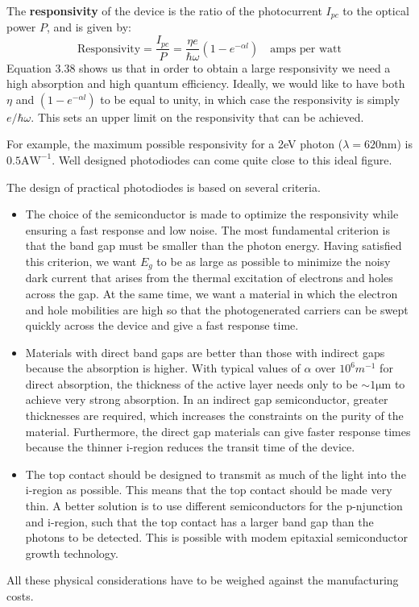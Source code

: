 \documentclass[12pt]{book}
\begin{document}
The \textbf{responsivity} of the device is the ratio of the photocurrent $I_{pc}$ to the optical power $P$, and is given by:
\begin{equation}\label{equa:3.38}
  \text{Responsivity}=\frac{I_{pc}}{P}=\frac{\eta e}{\hbar\omega}(1-e^{-\alpha l})\quad \text{amps per watt}
\end{equation}
Equation 3.38 shows us that in order to obtain a large responsivity we need a high absorption and high quantum efficiency. Ideally, we would like to have both $\eta$ and $(1 - e^{-\alpha l})$ to be equal to unity, in which case the responsivity is simply $e/\hbar\omega$. This sets an upper limit on the responsivity that can be achieved.

For example, the maximum possible responsivity for a 2eV photon ($\lambda = 620 \mathrm{nm}$) is $0.5\mathrm{AW^{-1}}$. Well designed photodiodes can come quite close to this ideal figure.

The design of practical photodiodes is based on several criteria.

\begin{itemize}
  \item The choice of the semiconductor is made to optimize the responsivity while ensuring a fast response and low noise. The most fundamental criterion is that the band gap must be smaller than the photon energy. Having satisfied this criterion, we want $E_g$ to be as large as possible to minimize the noisy dark current that arises from the thermal excitation of electrons and holes across the gap. At the same time, we want a material in which the electron and hole mobilities are high so that the photogenerated carriers can be swept quickly across the device and give a fast response time.
  \item Materials with direct band gaps are better than those with indirect gaps because the absorption is higher. With typical values of $\alpha$ over $10^6 m^{-1}$ for direct absorption, the thickness of the active layer needs only to be $\sim\mathrm{1\mu m}$ to achieve very strong absorption. In an indirect gap semiconductor, greater thicknesses are required, which increases the constraints on the purity of the material. Furthermore, the direct gap materials can give faster response times because the thinner i-region reduces the transit time of the device.
  \item The top contact should be designed to transmit as much of the light into the i-region as possible. This means that the top contact should be made very thin. A better solution is to use different semiconductors for the p-njunction and i-region, such that the top contact has a larger band gap than the photons to be detected. This is possible with modem epitaxial semiconductor growth technology.
\end{itemize}
All these physical considerations have to be weighed against the manufacturing costs.
\end{document}
